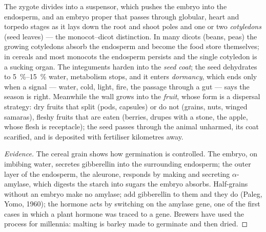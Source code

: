 \begin{definition}\label{def:b2:angiosperm-reproduction:seed}
The zygote divides into a suspensor, which pushes the embryo into
the endosperm, and an embryo proper that passes through globular,
heart and torpedo stages as it lays down the root and shoot poles
and one or two \emph{cotyledons} (seed leaves) --- the monocot--dicot
distinction. In many dicots (beans, peas) the growing cotyledons
absorb the endosperm and become the food store themselves; in
cereals and most monocots the endosperm persists and the single
cotyledon is a sucking organ. The integuments harden into the
\emph{seed coat}; the seed dehydrates to \qtyrange{5}{15}{\%} water,
metabolism stops, and it enters \emph{dormancy}, which ends only
when a signal --- water, cold, light, fire, the passage through a
gut --- says the season is right. Meanwhile the  wall grows into
the \emph{fruit}, whose form is a dispersal strategy: dry fruits
that split (pods, capsules) or do not (grains, nuts, winged
samaras), fleshy fruits that are eaten (berries, drupes with a stone,
the apple, whose flesh is receptacle); the seed passes through the
animal unharmed, its coat scarified, and is deposited with fertiliser
kilometres away.
\end{definition}
\begin{proof}[Evidence]
The cereal grain shows how germination is controlled. The embryo,
on imbibing water, secretes gibberellin into the surrounding
endosperm; the outer layer of the endosperm, the aleurone, responds
by making and secreting $\alpha$-amylase, which digests the starch
into sugars the embryo absorbs. Half-grains without an embryo make no
amylase; add gibberellin to them and they do (Paleg, Yomo, 1960); the
hormone acts by switching on the amylase gene, one of the first cases
in which a plant hormone was traced to a gene. Brewers have used the
process for millennia: malting is barley made to germinate and then
dried.
\end{proof}

